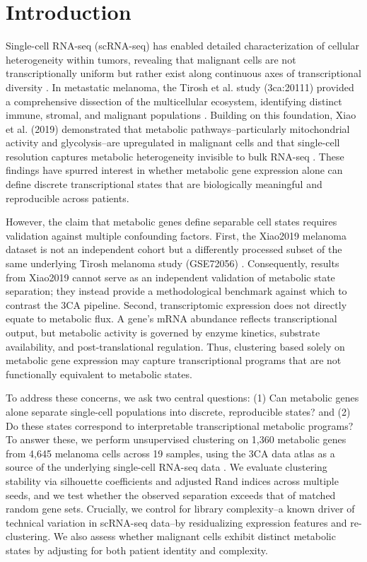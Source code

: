 \section{Introduction}

Single-cell RNA-seq (scRNA-seq) has enabled detailed characterization of cellular heterogeneity within tumors, revealing that malignant cells are not transcriptionally uniform but rather exist along continuous axes of transcriptional diversity \cite{Tirosh2016}. In metastatic melanoma, the Tirosh et al. study (3ca:20111) provided a comprehensive dissection of the multicellular ecosystem, identifying distinct immune, stromal, and malignant populations \cite{Tirosh2016}. Building on this foundation, Xiao et al. (2019) demonstrated that metabolic pathways--particularly mitochondrial activity and glycolysis--are upregulated in malignant cells and that single-cell resolution captures metabolic heterogeneity invisible to bulk RNA-seq \cite{Xiao2019}. These findings have spurred interest in whether metabolic gene expression alone can define discrete transcriptional states that are biologically meaningful and reproducible across patients.

However, the claim that metabolic genes define separable cell states requires validation against multiple confounding factors. First, the Xiao2019 melanoma dataset is not an independent cohort but a differently processed subset of the same underlying Tirosh melanoma study (GSE72056) \cite{Xiao2019}. Consequently, results from Xiao2019 cannot serve as an independent validation of metabolic state separation; they instead provide a methodological benchmark against which to contrast the 3CA pipeline. Second, transcriptomic expression does not directly equate to metabolic flux. A gene's mRNA abundance reflects transcriptional output, but metabolic activity is governed by enzyme kinetics, substrate availability, and post-translational regulation. Thus, clustering based solely on metabolic gene expression may capture transcriptional programs that are not functionally equivalent to metabolic states.

To address these concerns, we ask two central questions: (1) Can metabolic genes alone separate single-cell populations into discrete, reproducible states? and (2) Do these states correspond to interpretable transcriptional metabolic programs? To answer these, we perform unsupervised clustering on 1,360 metabolic genes from 4,645 melanoma cells across 19 samples, using the 3CA data atlas as a source of the underlying single-cell RNA-seq data \cite{Gavish2023}. We evaluate clustering stability via silhouette coefficients and adjusted Rand indices across multiple seeds, and we test whether the observed separation exceeds that of matched random gene sets. Crucially, we control for library complexity--a known driver of technical variation in scRNA-seq data--by residualizing expression features and re-clustering. We also assess whether malignant cells exhibit distinct metabolic states by adjusting for both patient identity and complexity.


